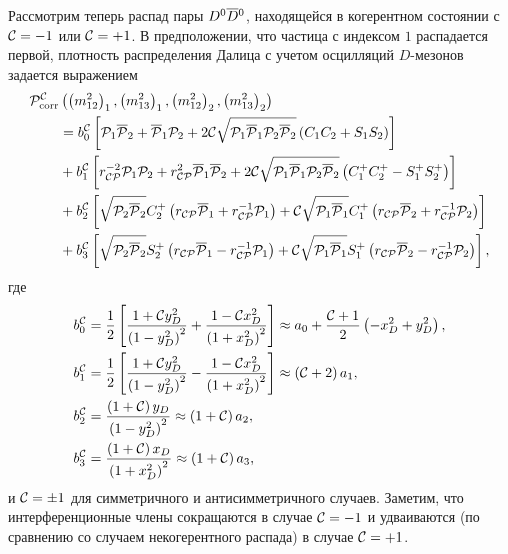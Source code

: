 Рассмотрим теперь распад пары $D^0\overline{D}{}^0$, находящейся в когерентном состоянии с $\mathcal{C}=-1$ или $\mathcal{C}=+1$.  В предположении, что частица с индексом $1$ распадается первой, плотность распределения Далица с учетом осцилляций $D$-мезонов задается выражением
\begin{equation}
 \begin{split}
  \mathcal{P}_{\mathrm{corr}}^{\mathcal{C}}&\left(\left(m_{12}^2\right)_1,\left(m_{13}^2\right)_1,\left(m_{12}^2\right)_2,\left(m_{13}^2\right)_2\right) \\
   & = b^\mathcal{C}_0\left [\mathcal{P}_1\overline{\mathcal{P}}_2+\overline{\mathcal{P}}_1\mathcal{P}_2 
     + 2 \mathcal{C} \sqrt{\mathcal{P}_1\overline{\mathcal{P}}_1\mathcal{P}_2\overline{\mathcal{P}}_2}\left( C_1C_2+S_1S_2\right)\right ]     \\
   & + b^\mathcal{C}_1\left [r_{\mathcal{CP}}^{-2}\mathcal{P}_1\mathcal{P}_2+r_{\mathcal{CP}}^2\overline{\mathcal{P}}_1\overline{\mathcal{P}}_2 
     + 2\mathcal{C}\sqrt{\mathcal{P}_1\overline{\mathcal{P}}_1\mathcal{P}_2\overline{\mathcal{P}}_2}\left( C^+_1C^+_2-S^+_1S^+_2\right)\right ]\\
   & + b^\mathcal{C}_2\left [\sqrt{\mathcal{P}_2\overline{\mathcal{P}}_2}C^+_2\left(r_{\mathcal{CP}}\overline{\mathcal{P}}_1+r_{\mathcal{CP}}^{-1}\mathcal{P}_1\right)
     + \mathcal{C}\sqrt{\mathcal{P}_1\overline{\mathcal{P}}_1}C^+_1\left(r_{\mathcal{CP}}\overline{\mathcal{P}}_2+r_{\mathcal{CP}}^{-1}\mathcal{P}_2\right)\right ]   \\
   & + b^\mathcal{C}_3\left[\sqrt{\mathcal{P}_2\overline{\mathcal{P}}_2}S^+_2\left(r_{\mathcal{CP}}\overline{\mathcal{P}}_1-r_{\mathcal{CP}}^{-1}\mathcal{P}_1\right)
     + \mathcal{C}\sqrt{\mathcal{P}_1\overline{\mathcal{P}}_1}S^+_1\left(r_{\mathcal{CP}}\overline{\mathcal{P}}_2-r_{\mathcal{CP}}^{-1}\mathcal{P}_2\right)\right ],
  \end{split}
\end{equation}
где
\begin{equation}
 \begin{split}
  b_0^\mathcal{C}&=\frac{1}{2}\left [\frac{1+\mathcal{C} y_D^2}{\left( 1-y_D^2\right)^2}+\frac{1-\mathcal{C} x_D^2}{\left( 1+x_D^2\right)^2}\right ]
  \approx a_0+\frac{\mathcal{C}+1}{2}\left( -x_D^2+y_D^2\right),\\
  b_1^\mathcal{C}&=\frac{1}{2}\left [\frac{1+\mathcal{C} y_D^2}{\left( 1-y_D^2\right)^2}-\frac{1-\mathcal{C} x_D^2}{\left( 1+x_D^2\right)^2}\right ]
  \approx \left(\mathcal{C}+2\right) a_1,\\
  b_2^\mathcal{C}&=\frac{\left( 1+\mathcal{C}\right) y_D}{\left( 1-y_D^2\right)^2}\approx\left( 1+\mathcal{C}\right) a_2,\\
  b_3^\mathcal{C}&=\frac{\left( 1+\mathcal{C}\right) x_D}{\left( 1+x_D^2\right)^2}\approx\left( 1+\mathcal{C}\right) a_3,
 \end{split}
\end{equation}
и $\mathcal{C}=\pm 1$ для симметричного и антисимметричного случаев.  Заметим, что интерференционные члены сокращаются в случае  $\mathcal{C}=-1$ и удваиваются (по сравнению со случаем некогерентного распада) в случае $\mathcal{C}=+1$.

